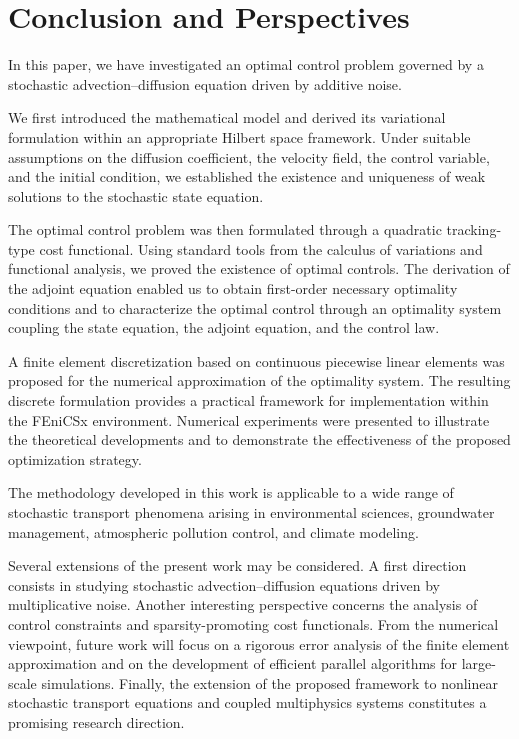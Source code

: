 \section{Conclusion and Perspectives}

In this paper, we have investigated an optimal control problem governed by a stochastic 
advection--diffusion equation driven by additive noise.

We first introduced the mathematical model and derived its variational formulation within 
an appropriate Hilbert space framework. Under suitable assumptions on the diffusion coefficient, 
the velocity field, the control variable, and the initial condition, we established the 
existence and uniqueness of weak solutions to the stochastic state equation.

The optimal control problem was then formulated through a quadratic tracking-type cost 
functional. Using standard tools from the calculus of variations and functional analysis, 
we proved the existence of optimal controls. The derivation of the adjoint equation enabled 
us to obtain first-order necessary optimality conditions and to characterize the optimal control 
through an optimality system coupling the state equation, the adjoint equation, and the control 
law.

A finite element discretization based on continuous piecewise linear elements was proposed for 
the numerical approximation of the optimality system. The resulting discrete formulation provides 
a practical framework for implementation within the FEniCSx environment. Numerical experiments 
were presented to illustrate the theoretical developments and to demonstrate the effectiveness 
of the proposed optimization strategy.

The methodology developed in this work is applicable to a wide range of stochastic transport 
phenomena arising in environmental sciences, groundwater management, atmospheric pollution 
control, and climate modeling.

Several extensions of the present work may be considered. A first direction consists in studying 
stochastic advection--diffusion equations driven by multiplicative noise. Another interesting 
perspective concerns the analysis of control constraints and sparsity-promoting cost functionals. 
From the numerical viewpoint, future work will focus on a rigorous error analysis of the finite 
element approximation and on the development of efficient parallel algorithms for large-scale 
simulations. Finally, the extension of the proposed framework to nonlinear stochastic transport 
equations and coupled multiphysics systems constitutes a promising research direction.
